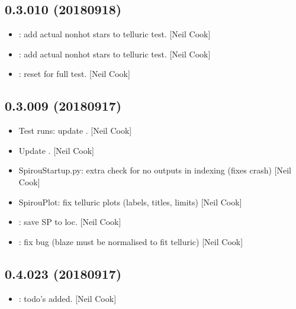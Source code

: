\documentclass[a4paper,10pt,english]{report}
\begin{document}
\subsection{0.3.010 (2018\sphinxhyphen{}09\sphinxhyphen{}18)}
\label{\detokenize{misc/changelog:id340}}\begin{itemize}
\item {} 
: add actual non\sphinxhyphen{}hot stars to telluric test. {[}Neil Cook{]}

\item {} 
: add actual non\sphinxhyphen{}hot stars to telluric test. {[}Neil Cook{]}

\item {} 
: reset for full test. {[}Neil Cook{]}

\end{itemize}


\subsection{0.3.009 (2018\sphinxhyphen{}09\sphinxhyphen{}17)}
\label{\detokenize{misc/changelog:id341}}\begin{itemize}
\item {} 
Test runs: update . {[}Neil Cook{]}

\item {} 
Update . {[}Neil Cook{]}

\item {} 
SpirouStartup.py: extra check for no outputs in indexing (fixes crash)
{[}Neil Cook{]}

\item {} 
SpirouPlot: fix telluric plots (labels, titles, limits) {[}Neil Cook{]}

\item {} 
: save SP to loc. {[}Neil Cook{]}

\item {} 
: fix bug (blaze must be normalised to fit telluric)
{[}Neil Cook{]}

\end{itemize}


\subsection{0.4.023 (2018\sphinxhyphen{}09\sphinxhyphen{}17)}
\label{\detokenize{misc/changelog:id342}}\begin{itemize}
\item {} 
: todo’s added. {[}Neil Cook{]}

\end{itemize}
\end{document}
